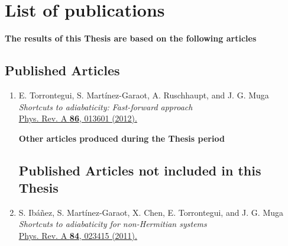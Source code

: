 \chapter{List of publications} %
\label{Publications}
 {\bf The results of this Thesis are based on the following articles}
\section*{{\large\bf Published  Articles}}

\begin{enumerate}

\item E. Torrontegui, S. Mart\'inez-Garaot, A. Ruschhaupt, and J. G. Muga
\\{\it Shortcuts to adiabaticity: Fast-forward approach}\\ \href{http://journals.aps.org/pra/abstract/10.1103/PhysRevA.86.013601}{Phys. Rev. A {\bf 86}, 013601 (2012).}

\vspace{1.25 cm}

 {\bf Other articles produced during the Thesis period}
\section*{{\large\bf Published  Articles not included in this Thesis}}

\item S. Ib\' a\~ nez, S. Mart\' inez-Garaot, X. Chen, E. Torrontegui, and J. G. Muga
\\{\it Shortcuts to adiabaticity for non-Hermitian systems}\\ \href{http://journals.aps.org/pra/abstract/10.1103/PhysRevA.84.023415}{Phys. Rev. A {\bf 84}, 023415 (2011).}

\end{enumerate}

